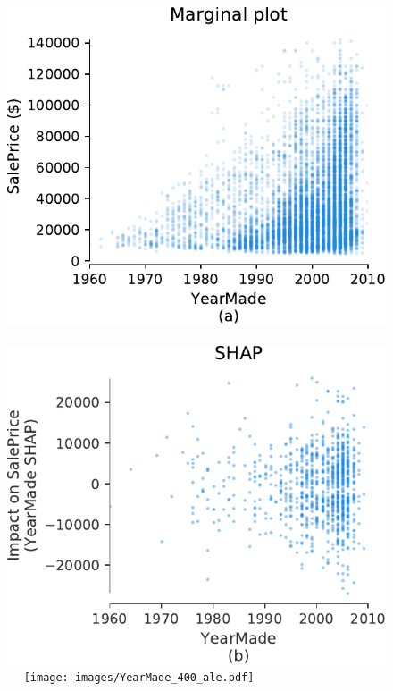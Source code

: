 \documentclass{article}
\begin{document}
\begin{figure}[htbp]
\begin{center}
\includegraphics[scale=0.35]{images/bulldozer_YearMade_marginal.pdf}~~
\includegraphics[scale=0.35]{images/bulldozer_YearMade_shap.pdf}~~
\texttt{[image: images/YearMade\_400\_ale.pdf]}~~

\end{center}
\end{figure}
\end{document}
